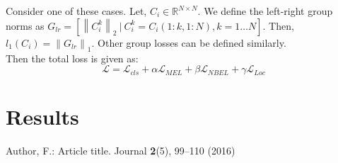 \documentclass[runningheads]{llncs}
\begin{document}
Consider one of these cases. Let, $C_i \in \mathbb{R}^{N \times N}$. We define the left-right group
norms as $G_{lr} = [\left\lVert C^{k}_i \right\rVert_2~|~C^{k}_i = C_i(1:k,1:N), k = 1 \dots N]$. Then,
$l_1(C_i) = \left\lVert G_{lr} \right\rVert_1$. Other group losses can be defined similarly.\\

Then the total loss is given as:
\begin{equation}
	\mathcal{L} = \mathcal{L}_{cls} + \alpha \mathcal{L}_{MEL} + \beta \mathcal{L}_{NBEL} + \gamma
	\mathcal{L}_{Loc}
\end{equation}

\section{Results}

%
%
% 
% 
%
\begin{thebibliography}{8}
Author, F.: Article title. Journal \textbf{2}(5), 99--110 (2016)

\end{thebibliography}
\end{document}
